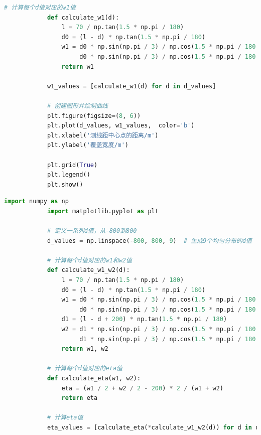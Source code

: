 \documentclass[withoutpreface,bwprint]{cumcmthesis} %
\begin{document}
\begin{appendices}
\begin{lstlisting}[language=Python]
            # 计算每个d值对应的w1值
            def calculate_w1(d):
                l = 70 / np.tan(1.5 * np.pi / 180)
                d0 = (l - d) * np.tan(1.5 * np.pi / 180)
                w1 = d0 * np.sin(np.pi / 3) / np.cos(1.5 * np.pi / 180 - np.pi / 3) + \
                     d0 * np.sin(np.pi / 3) / np.cos(1.5 * np.pi / 180 + np.pi / 3)
                return w1
            
            w1_values = [calculate_w1(d) for d in d_values]
            
            # 创建图形并绘制曲线
            plt.figure(figsize=(8, 6))
            plt.plot(d_values, w1_values,  color='b')
            plt.xlabel('测线距中心点的距离/m')
            plt.ylabel('覆盖宽度/m')
            
            plt.grid(True)
            plt.legend()
            plt.show()

        \end{lstlisting}  
        \begin{lstlisting}[language=Python]
            import numpy as np
            import matplotlib.pyplot as plt
            
            # 定义一系列d值，从-800到800
            d_values = np.linspace(-800, 800, 9)  # 生成9个均匀分布的d值
            
            # 计算每个d值对应的w1和w2值
            def calculate_w1_w2(d):
                l = 70 / np.tan(1.5 * np.pi / 180)
                d0 = (l - d) * np.tan(1.5 * np.pi / 180)
                w1 = d0 * np.sin(np.pi / 3) / np.cos(1.5 * np.pi / 180 - np.pi / 3) + \
                     d0 * np.sin(np.pi / 3) / np.cos(1.5 * np.pi / 180 + np.pi / 3)
                d1 = (l - d + 200) * np.tan(1.5 * np.pi / 180)
                w2 = d1 * np.sin(np.pi / 3) / np.cos(1.5 * np.pi / 180 - np.pi / 3) + \
                     d1 * np.sin(np.pi / 3) / np.cos(1.5 * np.pi / 180 + np.pi / 3)
                return w1, w2
            
            # 计算每个d值对应的eta值
            def calculate_eta(w1, w2):
                eta = (w1 / 2 + w2 / 2 - 200) * 2 / (w1 + w2)
                return eta
            
            # 计算eta值
            eta_values = [calculate_eta(*calculate_w1_w2(d)) for d in d_values]
            

\end{lstlisting}
\end{appendices}
\end{document}
